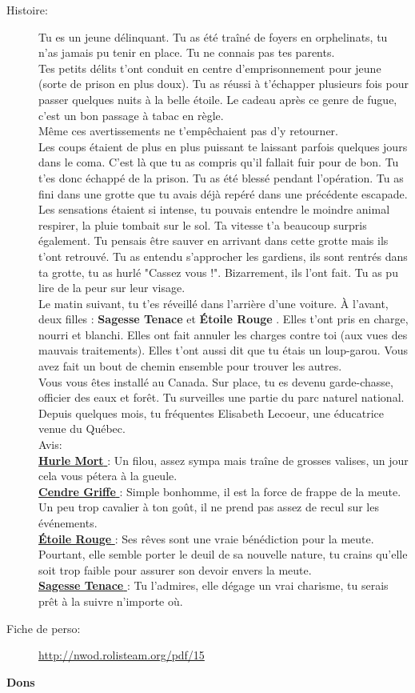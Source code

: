 \documentclass[oneside,12pt]{book}
\newcommand{\Lynn}{\textbf{Étoile Rouge} }
\newcommand{\Jessica}{\textbf{Sagesse Tenace} }
\newcommand{\Luke}{\textbf{Cendre Griffe} }
\newcommand{\Peter}{\textbf{Hurle Mort} }
\begin{document}
\begin{flushleft}
\begin{description}
\item[Histoire:]{
Tu es un jeune délinquant. Tu as été traîné de foyers en orphelinats, tu n'as jamais pu tenir en place. 
Tu ne connais pas tes parents.\\ 
Tes petits délits t'ont conduit en centre d'emprisonnement pour jeune (sorte de prison en plus doux). 
Tu as réussi à t'échapper plusieurs fois pour passer quelques nuits à la belle étoile. 
Le cadeau après ce genre de fugue, c'est un bon passage à tabac en règle. \\
Même ces avertissements ne t'empêchaient pas d'y retourner. \\
Les coups étaient de plus en plus puissant te laissant parfois quelques jours dans le coma. 
C'est là que tu as compris qu'il fallait fuir pour de bon. Tu t'es donc échappé de la prison. 
Tu as été blessé pendant l'opération. Tu as fini dans une grotte que tu avais déjà repéré dans une précédente escapade. Les sensations étaient si intense, tu pouvais entendre le moindre animal respirer, la pluie tombait sur le sol. Ta vitesse t'a beaucoup surpris également. Tu pensais être sauver en arrivant dans cette grotte mais ils t'ont retrouvé.
Tu as entendu s'approcher les gardiens, ils sont rentrés dans ta grotte, tu as hurlé "Cassez vous !". 
Bizarrement, ils l'ont fait. Tu as pu lire de la peur sur leur visage. \\
Le matin suivant, tu t'es réveillé dans l'arrière d'une voiture. À l'avant, deux filles : \Jessica et \Lynn. Elles t'ont pris en charge, nourri et blanchi. 
Elles ont fait annuler les charges contre toi (aux vues des mauvais traitements). Elles t'ont aussi dit que tu étais un loup-garou. Vous avez fait un bout de chemin ensemble pour trouver les autres. \\
Vous vous êtes installé au Canada. Sur place, tu es devenu garde-chasse, officier des eaux et forêt. Tu surveilles une  partie du parc naturel national. \\ 
Depuis quelques mois, tu fréquentes Elisabeth Lecoeur, une éducatrice venue du Québec.\\ 
Avis:\\
\underline{\Peter} : Un filou, assez sympa mais traîne de grosses valises, un jour cela vous pétera à la gueule.\\
\underline{\Luke} : Simple bonhomme, il est la force de frappe de la meute. Un peu trop cavalier à ton goût, il ne prend pas assez de recul sur les événements.\\
\underline{\Lynn}  : Ses rêves sont une vraie bénédiction pour la meute. Pourtant, elle semble porter le deuil de sa nouvelle nature, tu crains qu'elle soit trop faible pour assurer son devoir envers la meute.\\
\underline{\Jessica}: Tu l'admires, elle dégage un vrai charisme, tu serais prêt à la suivre n'importe où.\\
}
\item[Fiche de perso:]{\href{http://nwod.rolisteam.org/pdf/15}{http://nwod.rolisteam.org/pdf/15}}
\end{description}
\clearpage
\textbf{\large Dons} 
\vspace{0.5cm}


\end{flushleft}
\end{document}
